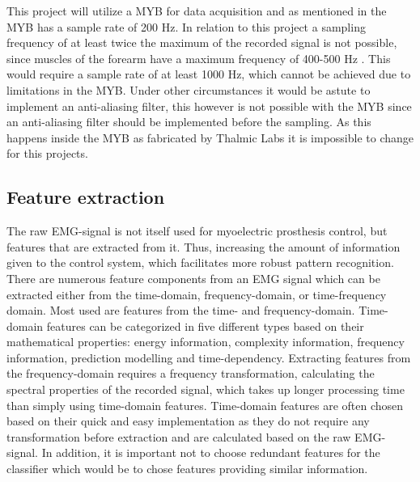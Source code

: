 This project will utilize a MYB for data acquisition and as mentioned in  the MYB has a sample rate of 200 Hz. In relation to this project a sampling frequency of at least twice the maximum of the recorded signal is not possible, since muscles of the forearm have a maximum frequency of 400-500 Hz \cite{Cram2012}. This would require a sample rate of at least 1000 Hz, which cannot be achieved due to limitations in the MYB. Under other circumstances it would be astute to implement an anti-aliasing filter, this however is not possible with the MYB since an anti-aliasing filter should be implemented before the sampling. As this happens inside the MYB as fabricated by Thalmic Labs it is impossible to change for this projects. 


\subsection{Feature extraction} \label{sub:BG:featureExtraction} %

The raw EMG-signal is not itself used for myoelectric prosthesis control, but features that are extracted from it. Thus, increasing the amount of information given to the control system, which facilitates more robust pattern recognition. \\
There are numerous feature components from an EMG signal which can be extracted either from the time-domain, frequency-domain, or time-frequency domain. Most used are features from the time- and frequency-domain. Time-domain features can be categorized in five different types based on their mathematical properties: energy information, complexity information, frequency information, prediction modelling and time-dependency. Extracting features from the frequency-domain requires a frequency transformation, calculating the spectral properties of the recorded signal, which takes up longer processing time than simply using time-domain features. 
Time-domain features are often chosen based on their quick and easy implementation as they do not require any transformation before extraction and are calculated based on the raw EMG-signal. In addition, it is important not to choose redundant features for the classifier which would be to chose features providing similar information. \cite{Phiny2012} 


